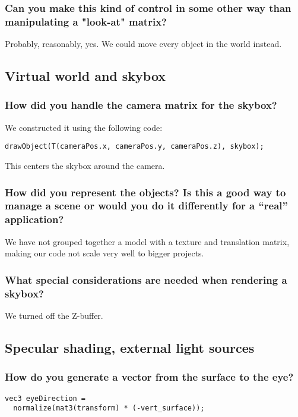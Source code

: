 \documentclass[a4paper,12pt]{article}
\begin{document}
\subsubsection{Can you make this kind of control in some other way
  than manipulating a "look-at" matrix?}
Probably, reasonably, yes. We could move every object in the world instead.

\subsection{Virtual world and skybox}
\subsubsection{How did you handle the camera matrix for the skybox?}
We constructed it using the following code:
\begin{lstlisting}[float,label=lst:cameramatrix,caption=nextHopInfo: Camera matrix code]
  	drawObject(T(cameraPos.x, cameraPos.y, cameraPos.z), skybox);
\end{lstlisting}
This centers the skybox around the camera.

\subsubsection{How did you represent the objects? Is this a good way to manage a scene or would you do it differently for a ``real'' application?}
We have not grouped together a model with a texture and translation matrix, making our code not scale very well to bigger projects.

\subsubsection{What special considerations are needed when rendering a skybox?}
We turned off the Z-buffer.

\subsection{Specular shading, external light sources}
\subsubsection{How do you generate a vector from the surface to the eye? }
\begin{lstlisting}[float,label=lst:label,caption=Surface to eye]
vec3 eyeDirection =
  normalize(mat3(transform) * (-vert_surface));
\end{lstlisting}
\end{document}
